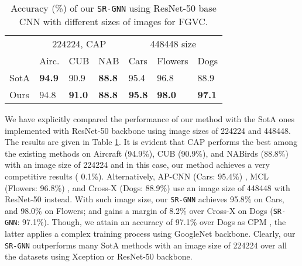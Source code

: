 \documentclass[journal]{IEEEtran}
\begin{document}
\begin{table}
\begin{center}
 \caption{Accuracy (\%) of our \texttt{SR-GNN} using ResNet-50 base CNN with different sizes of images for FGVC.} 
 \label{table:RN50}
\begin{tabular}{|p{0.5cm}|p{0.68 cm}p{0.68 cm}p{0.68 cm}|p{1.03 cm}p{1.03 cm}p{1.2 cm}|}
 \hline
\multicolumn{1}{|c|}{}&
\multicolumn{3}{c|}{224224, CAP \cite{behera2021context}}&   \multicolumn{3}{c|}{448448 size} \\
 & Airc. &CUB &NAB&Cars&Flowers&Dogs  \\
    \hline
SotA &\textbf{94.9} &90.9 & \textbf{88.8}&95.4\cite{ding2021ap}  &96.8\cite{chang2020devil} & {88.9} \cite{luo2019cross}\\   \hline
Ours & {94.8} &\textbf{91.0} & \textbf{88.8}  &\textbf{95.8} &\textbf{98.0} &\textbf{97.1} \\
\hline
\end{tabular} \end{center}
  \vspace{-0.6cm}
\end{table}

We have explicitly compared the performance of our method with the SotA ones implemented with ResNet-50 backbone using image sizes of 224224 and 448448. The results are given in Table \ref{table:RN50}. It is evident that CAP performs the best among the existing methods on Aircraft (94.9\%), CUB (90.9\%), and NABirds (88.8\%) with an image size of 224224 and in  this case, our method achieves a very competitive results ( 0.1\%).  Alternatively, AP-CNN (Cars: 95.4\%) \cite{ding2021ap}, MCL (Flowers: 96.8\%) \cite{chang2020devil}, and Cross-X (Dogs: 88.9\%) \cite{luo2019cross} use an image size of 448448 with ResNet-50 instead. With such image size, our \texttt{SR-GNN} achieves 95.8\% on Cars, and 98.0\% on Flowers; and gains a margin of 8.2\% over Cross-X on Dogs (\texttt{SR-GNN}: 97.1\%). Though, we attain an accuracy of 97.1\%  over Dogs as CPM \cite{ge2019weakly}, the latter applies a complex training process using GoogleNet backbone. Clearly, our \texttt{SR-GNN} outperforms many SotA methods with an image size of 224224 over all the datasets using Xception or ResNet-50 backbone. 
\end{document}
